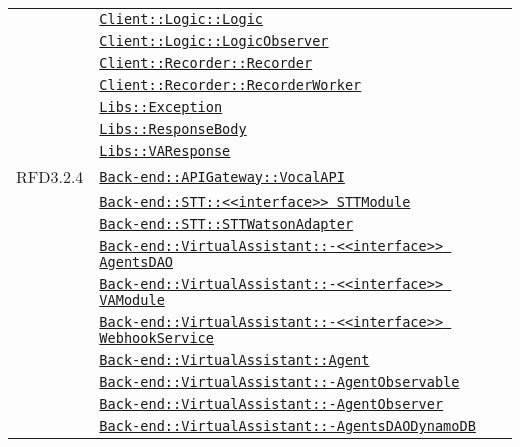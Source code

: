 \begin{longtable}{|>{\centering}m{3cm}|m{10cm}<{\centering}|}
& \hyperref[Client::Logic::Logic]{\texttt{Client::Logic::Logic}}\\
& \hyperref[Client::Logic::LogicObserver]{\texttt{Client::Logic::LogicObserver}}\\
& \hyperref[Client::Recorder::Recorder]{\texttt{Client::Recorder::Recorder}}\\
& \hyperref[Client::Recorder::RecorderWorker]{\texttt{Client::Recorder::RecorderWorker}}\\
& \hyperref[Libs::Exception]{\texttt{Libs::Exception}}\\
& \hyperref[Libs::ResponseBody]{\texttt{Libs::ResponseBody}}\\
& \hyperref[Libs::VAResponse]{\texttt{Libs::VAResponse}}\\ \hline

RFD3.2.4 & \hyperref[Back-end::APIGateway::VocalAPI]{\texttt{Back-end::APIGateway::VocalAPI}}\\
& \hyperref[Back-end::STT::<<interface>> STTModule]{\texttt{Back-end::STT::<<interface>> STTModule}}\\
& \hyperref[Back-end::STT::STTWatsonAdapter]{\texttt{Back-end::STT::STTWatsonAdapter}}\\
& \hyperref[Back-end::VirtualAssistant::<<interface>> AgentsDAO]{\texttt{Back-end::VirtualAssistant::-\linebreak <<interface>> AgentsDAO}}\\
& \hyperref[Back-end::VirtualAssistant::<<interface>> VAModule]{\texttt{Back-end::VirtualAssistant::-\linebreak <<interface>> VAModule}}\\
& \hyperref[Back-end::VirtualAssistant::<<interface>> WebhookService]{\texttt{Back-end::VirtualAssistant::-\linebreak <<interface>> WebhookService}}\\
& \hyperref[Back-end::VirtualAssistant::Agent]{\texttt{Back-end::VirtualAssistant::Agent}}\\
& \hyperref[Back-end::VirtualAssistant::AgentObservable]{\texttt{Back-end::VirtualAssistant::-\linebreak AgentObservable}}\\
& \hyperref[Back-end::VirtualAssistant::AgentObserver]{\texttt{Back-end::VirtualAssistant::-\linebreak AgentObserver}}\\
& \hyperref[Back-end::VirtualAssistant::AgentsDAODynamoDB]{\texttt{Back-end::VirtualAssistant::-\linebreak AgentsDAODynamoDB}}\\

\end{longtable}
